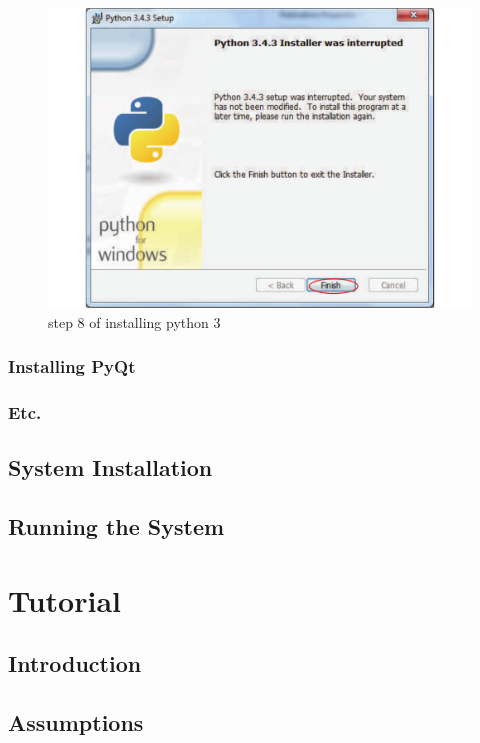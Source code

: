 \begin{figure}[H]
    \includegraphics[width=\textwidth]{./Manual/images/python8.pdf}
    \caption{step 8 of installing python 3} \label{fig:installing python3 8}
\end{figure}

\subsubsection{Installing PyQt}

\subsubsection{Etc.}

\subsection{System Installation}

\subsection{Running the System}

\section{Tutorial}

\subsection{Introduction}

\subsection{Assumptions}

